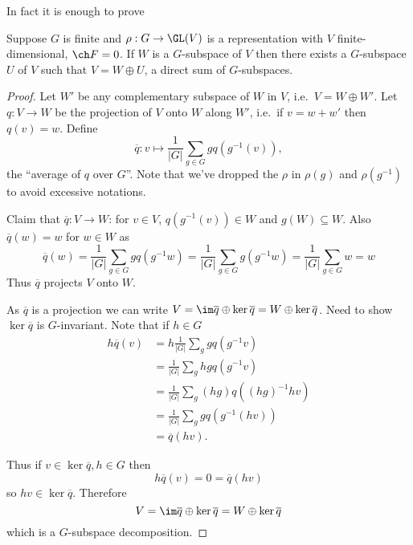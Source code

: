 \documentclass[a4paper]{article}
\theoremstyle{definition}
\begin{document}
In fact it is enough to prove

\begin{theorem}[Maschke]
  \label{thm:Maschke}
  Suppose \(G\) is finite and \(\rho: G \to \GL(V)\) is a representation with \(V\) finite-dimensional, \(\ch F = 0\). If \(W\) is a \(G\)-subspace of \(V\) then there exists a \(G\)-subspace \(U\) of \(V\) such that \(V = W \oplus U\), a direct sum of \(G\)-subspaces.
\end{theorem}

\begin{proof}
  Let \(W'\) be any complementary subspace of \(W\) in \(V\), i.e.\ \(V = W \oplus W'\). Let \(q: V \to W\) be the projection of \(V\) onto \(W\) along \(W'\), i.e.\ if \(v = w + w'\) then \(q(v) = w\). Define
  \[
    \overline q: v \mapsto \frac{1}{|G|} \sum_{g \in G} g q(g^{-1}(v)),
  \]
  the ``average of \(q\) over \(G\)''. Note that we've dropped the \(\rho\) in \(\rho(g)\) and \(\rho(g^{-1})\) to avoid excessive notations.

  Claim that \(\overline q: V \to W\): for \(v \in V\), \(q(g^{-1}(v)) \in W\) and \(g(W) \subseteq W\). Also \(\overline q(w) = w\) for \(w \in W\) as
  \[
    \overline q(w)
    = \frac{1}{|G|} \sum_{g \in G} g q(g^{-1}w)
    = \frac{1}{|G|} \sum_{g \in G} g (g^{-1}w)
    = \frac{1}{|G|} \sum_{g \in G} w
    = w
  \]
  Thus \(\overline q\) projects \(V\) onto \(W\).

  As \(\overline q\) is a projection we can write \(V = \im \overline q \oplus \ker \overline q = W \oplus \ker \overline q\). Need to show \(\ker \overline q\) is \(G\)-invariant. Note that if \(h \in G\)
  \begin{align*}
    h \overline q(v)
    &= h \frac{1}{|G|} \sum_g g q(g^{-1}v) \\
    &= \frac{1}{|G|} \sum_g hg q(g^{-1}v) \\
    &= \frac{1}{|G|} \sum_g (hg) q((hg)^{-1} hv) \\
    &= \frac{1}{|G|} \sum_g g q(g^{-1}(hv)) \\
    &= \overline q(hv).
  \end{align*}

  Thus if \(v \in \ker \overline q, h \in G\) then
  \[
    h\overline q(v) = 0 = \overline q(hv)
  \]
  so \(hv \in \ker \overline q\). Therefore
  \[
    V = \im \overline q \oplus \ker \overline q = W \oplus \ker \overline q
  \]
  which is a \(G\)-subspace decomposition.
\end{proof}
\end{document}
